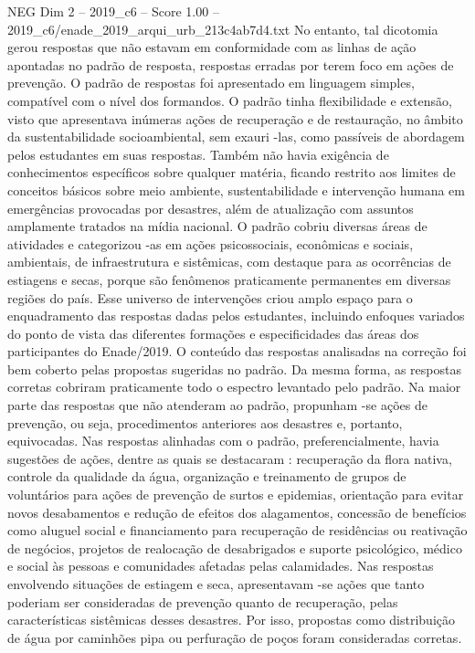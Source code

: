 \begin{textsample}{NEG Dim 2 – 2019\_c6 – Score 1.00 – 2019\_c6/enade\_2019\_arqui\_urb\_213c4ab7d4.txt}
No entanto, tal dicotomia gerou respostas que não estavam em conformidade com as linhas de ação apontadas no padrão de resposta, respostas erradas por terem foco em ações de prevenção.
O padrão de respostas foi apresentado em linguagem simples, compatível com o nível dos formandos.
O padrão tinha flexibilidade e extensão, visto que apresentava inúmeras ações de recuperação e de restauração, no âmbito da sustentabilidade socioambiental, sem exauri -las, como passíveis de abordagem pelos estudantes em suas respostas.
Também não havia exigência de conhecimentos específicos sobre qualquer matéria, ficando restrito aos limites de conceitos básicos sobre meio ambiente, sustentabilidade e intervenção humana em emergências provocadas por desastres, além de atualização com assuntos amplamente tratados na mídia nacional.
O padrão cobriu diversas áreas de atividades e categorizou -as em ações psicossociais, econômicas e sociais, ambientais, de infraestrutura e sistêmicas, com destaque para as ocorrências de estiagens e secas, porque são fenômenos praticamente permanentes em diversas regiões do país.
Esse universo de intervenções criou amplo espaço para o enquadramento das respostas dadas pelos estudantes, incluindo enfoques variados do ponto de vista das diferentes formações e especificidades das áreas dos participantes do Enade/2019.
O conteúdo das respostas analisadas na correção foi bem coberto pelas propostas sugeridas no padrão.
Da mesma forma, as respostas corretas cobriram praticamente todo o espectro levantado pelo padrão.
Na maior parte das respostas que não atenderam ao padrão, propunham -se ações de prevenção, ou seja, procedimentos anteriores aos desastres e, portanto, equivocadas.
Nas respostas alinhadas com o padrão, preferencialmente, havia sugestões de ações, dentre as quais se destacaram : recuperação da flora nativa, controle da qualidade da água, organização e treinamento de grupos de voluntários para ações de prevenção de surtos e epidemias, orientação para evitar novos desabamentos e redução de efeitos dos alagamentos, concessão de benefícios como aluguel social e financiamento para recuperação de residências ou reativação de negócios, projetos de realocação de desabrigados e suporte psicológico, médico e social às pessoas e comunidades afetadas pelas calamidades.
Nas respostas envolvendo situações de estiagem e seca, apresentavam -se ações que tanto poderiam ser consideradas de prevenção quanto de recuperação, pelas características sistêmicas desses desastres.
Por isso, propostas como distribuição de água por caminhões pipa ou perfuração de poços foram consideradas corretas.

\end{textsample}
